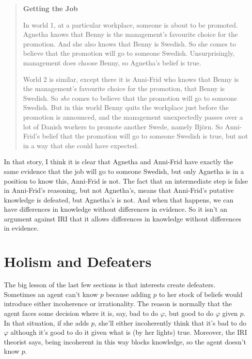 \documentclass[
  11pt,
  letterpaper,
  DIV=11,
  numbers=noendperiod,
  oneside]{scrartcl}
\begin{document}
\begin{quote}
\textbf{Getting the Job}

In world 1, at a particular workplace, someone is about to be promoted.
Agnetha knows that Benny is the management's favourite choice for the
promotion. And she also knows that Benny is Swedish. So she comes to
believe that the promotion will go to someone Swedish. Unsurprisingly,
management does choose Benny, so Agnetha's belief is true.

World 2 is similar, except there it is Anni-Frid who knows that Benny is
the management's favourite choice for the promotion, that Benny is
Swedish. So \emph{she} comes to believe that the promotion will go to
someone Swedish. But in this world Benny quits the workplace just before
the promotion is announced, and the management unexpectedly passes over
a lot of Danish workers to promote another Swede, namely Björn. So
Anni-Frid's belief that the promotion will go to someone Swedish is
true, but not in a way that she could have expected.
\end{quote}

In that story, I think it is clear that Agnetha and Anni-Frid have
exactly the same evidence that the job will go to someone Swedish, but
only Agnetha is in a position to know this, Anni-Frid is not. The fact
that an intermediate step is false in Anni-Frid's reasoning, but not
Agnetha's, means that Anni-Frid's putative knowledge is defeated, but
Agnetha's is not. And when that happens, we can have differences in
knowledge without differences in evidence. So it isn't an argument
against IRI that it allows differences in knowledge without differences
in evidence.

\section{Holism and Defeaters}\label{sect:holism}

The big lesson of the last few sections is that interests create
defeaters. Sometimes an agent can't know \(p\) because adding \(p\) to
her stock of beliefs would introduce either incoherence or
irrationality. The reason is normally that the agent faces some decision
where it is, say, bad to do \(\varphi\), but good to do \(\varphi\)
given \(p\). In that situation, if she adds \(p\), she'll either
incoherently think that it's bad to do \(\varphi\) although it's good to
do it given what is (by her lights) true. Moreover, the IRI theorist
says, being incoherent in this way blocks knowledge, so the agent
doesn't know \(p\).
\end{document}

